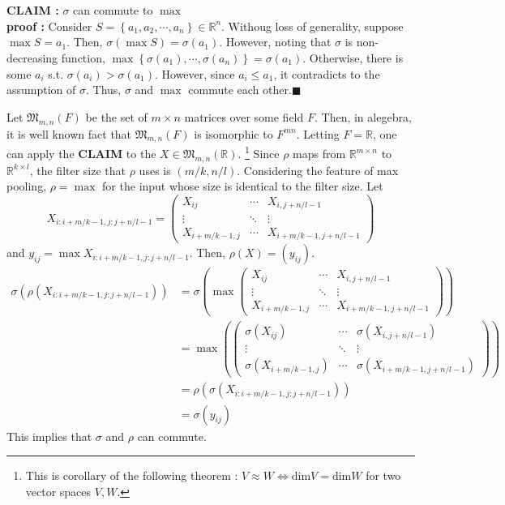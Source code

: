 \documentclass[10pt]{article}
\begin{document}
\section{}
\textbf{CLAIM : }$\sigma$ can commute to $\max$
\\
\textbf{proof : }
Consider $S = \left\{a_1,a_2,\cdots, a_n\right\}\in\mathbb{R}^n$. Withoug loss of generality, suppose $\max S = a_1$. Then, $\sigma(\max S) = \sigma(a_1)$. 
However, noting that $\sigma$ is non-decreasing function, $\max\left\{\sigma(a_1), \cdots,\sigma(a_n) \right\} = \sigma(a_1)$. Otherwise, there is some $a_i$ s.t. $\sigma(a_i) > \sigma(a_1)$. However, since $a_i\le a_1$, it contradicts to the assumption of $\sigma$.
Thus, $\sigma$ and $\max$ commute each other.$\blacksquare$

Let $\mathfrak{M}_{m,n}(F)$ be the set of $m\times n$ matrices over some field $F$. Then, in alegebra, it is well known fact that $\mathfrak{M}_{m,n}(F)$ is isomorphic to $F^{mn}$. Letting $F = \mathbb{R}$, one can apply the \textbf{CLAIM} to the $X\in\mathfrak{M}_{m,n}(\mathbb{R})$.
\footnote{This is corollary of the following theorem : $V \approx W \iff \text{dim}V = \text{dim}W$ for two vector spaces $V, W$.}
Since $\rho$ maps from $\mathbb{R}^{m\times n}$ to $\mathbb{R}^{k\times l}$, the filter size that $\rho$ uses is $(m/k, n/l)$. 
Considering the feature of max pooling, $\rho = \max$ for the input whose size is identical to the filter size. 
Let 
\begin{equation*}
    X_{i:i+m/k-1, j:j+n/l-1} = \begin{pmatrix}
        X_{ij} & \cdots & X_{i,j+n/l-1} \\ \vdots & \ddots & \vdots \\ X_{i+m/k-1,j} & \cdots & X_{i+m/k-1,j+n/l-1}
    \end{pmatrix}
\end{equation*}
and $y_{ij} = \max X_{i:i+m/k-1,j:j+n/l-1}$. Then, $\rho(X) = (y_{ij})$. 
\begin{align*}
    \sigma(\rho(X_{i:i+m/k-1,j:j+n/l-1})) &= \sigma\left(\max \begin{pmatrix}X_{ij} & \cdots & X_{i,j+n/l-1} \\ \vdots & \ddots & \vdots \\ X_{i+m/k-1,j} & \cdots & X_{i+m/k-1,j+n/l-1} \end{pmatrix}\right)
    \\ &= \max \left(\begin{pmatrix}
        \sigma(X_{ij}) & \cdots & \sigma(X_{i,j+n/l-1}) \\ \vdots & \ddots & \vdots \\ \sigma(X_{i+m/k-1,j}) & \cdots & \sigma(X_{i+m/k-1,j+n/l-1})
    \end{pmatrix}\right)
    \\ &= \rho(\sigma(X_{i:i+m/k-1,j:j+n/l-1}))
    \\ &= \sigma(y_{ij})
\end{align*}
This implies that $\sigma$ and $\rho$ can commute.
\end{document}
